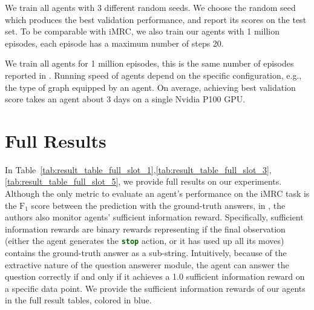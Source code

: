 \documentclass[11pt]{article}
\newcommand{\code}[1]{\texttt{#1}}
\newcommand{\cmd}[1]{\textcolor{darkgreen}{\textbf{\small{\code{#1}}}}}
\newcommand{\fone}{$\text{F}_1$\xspace}
\newcommand{\imrc}{iMRC\xspace}
\begin{document}
We train all agents with 3 different random seeds. 
We choose the random seed which produces the best validation performance, and report its scores on the test set.
To be comparable with \imrc, we also train our agents with 1 million episodes, each episode has a maximum number of steps 20.

We train all agents for 1 million episodes, this is the same number of episodes reported in \citep{yuan2020imrc}.
Running speed of agents depend on the specific configuration, e.g., the type of graph equipped by an agent.
On average, achieving best validation score takes an agent about 3 days on a single Nvidia P100 GPU.

\section{Full Results}
\label{appendix:full_results}

In Table~\ref{tab:result_table_full_slot_1},\ref{tab:result_table_full_slot_3},\ref{tab:result_table_full_slot_5}, we provide full results on our experiments.
Although the only metric to evaluate an agent's performance on the \imrc task is the \fone score between the prediction with the ground-truth answers, in \citep{yuan2020imrc}, the authors also monitor agents' sufficient information reward.
Specifically, sufficient information rewards are binary rewards representing if the final observation (either the agent generates the \cmd{stop} action, or it has used up all its moves) contains the ground-truth answer as a sub-string.
Intuitively, because of the extractive nature of the question answerer module, the agent can answer the question correctly if and only if it achieves a 1.0 sufficient information reward on a specific data point. 
We provide the sufficient information rewards of our agents in the full result tables, colored in blue.
\end{document}
